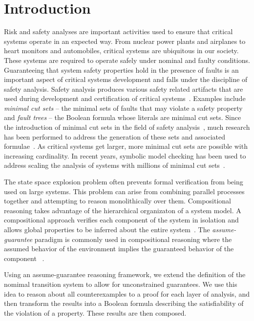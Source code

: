 \section{Introduction}
\label{sec:intro}

Risk and safety analyses are important activities used to ensure that critical systems operate in an expected way. From nuclear power plants and airplanes to heart monitors and automobiles, critical systems are ubiquitous in our society. These systems are required to operate safely under nominal and faulty conditions. Guaranteeing that system safety properties hold in the presence of faults is an important aspect of critical systems development and falls under the discipline of safety analysis. Safety analysis produces various safety related artifacts that are used during development and certification of critical systems~\cite{SAE:ARP4754A}. Examples include {\em minimal cut sets} -- the minimal sets of faults that may violate a safety property and {\em fault trees} -- the Boolean formula whose literals are minimal cut sets. Since the introduction of minimal cut sets in the field of safety analysis~\cite{vesely1981fault}, much research has been performed to address the generation of these sets and associated formulae~\cite{fta:survey,historyFTA}. As critical systems get larger, more minimal cut sets are possible with increasing cardinality. In recent years, symbolic model checking has been used to address scaling the analysis of systems with millions of minimal cut sets~\cite{bieber2002combination,schafer2003combining,symbFTA}. 

The state space explosion problem often prevents formal verification from being used on large systems. This problem can arise from combining parallel processes together and attempting to reason monolithically over them. Compositional reasoning takes advantage of the hierarchical organizaton of a system model. A compositional approach verifies each component of the system in isolation and allows global properties to be inferred about the entire system~\cite{berezin1997compositional}. The {\em assume-guarantee} paradigm is commonly used in compositional reasoning where the assumed behavior of the environment implies the guaranteed behavior of the component ~\cite{NFM2012:CoGaMiWhLaLu}.

Using an assume-guarantee reasoning framework, we extend the definition of the nomimal transition system to allow for unconstrained guarantees. We use this idea to reason about all counterexamples to a proof for each layer of analysis, and then transform the results into a Boolean formula describing the satisfiability of the violation of a property. These results are then composed. 

